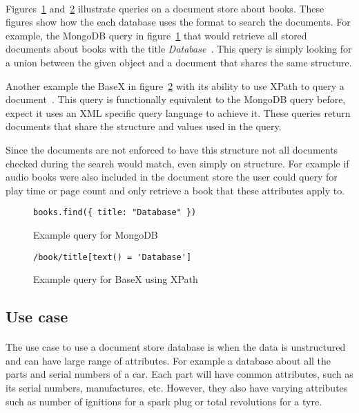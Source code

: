 \documentclass{CRPITStyle}
\renewcommand{\cite}{\citep}
\begin{document}
\paragraph{}
Figures~\ref{lst:mongo} and~\ref{lst:basex} illustrate queries on a document
store about books.
These figures show how the each database uses the format to search
the documents.
For example, the MongoDB query in figure~\ref{lst:mongo} that would retrieve all
stored documents about books with the title
\textit{Database}~\cite{nosql_db}.
This query is simply looking for a union between the given object and a
document that shares the same structure.

Another example the BaseX in figure~\ref{lst:basex} with its
ability to use XPath to query a document~\cite{basex}.
This query is functionally equivalent to the MongoDB query before, expect it uses
an XML specific query language to achieve it.
These queries return documents that share the structure and values used in the
query.

Since the documents are not enforced to have this structure not all documents
checked during the search would match, even simply on structure.
For example if audio books were also included in the document store the user
could query for play time or page count and only retrieve a book that these
attributes apply to.

\begin{figure}
\begin{verbatim}
books.find({ title: "Database" })
\end{verbatim}
\caption{Example query for MongoDB}
\label{lst:mongo}
\end{figure}

\begin{figure}
\begin{verbatim}
/book/title[text() = 'Database']
\end{verbatim}
\caption{Example query for BaseX using XPath}
\label{lst:basex}
\end{figure}

\subsection{Use case}

\paragraph{}
The use case to use a document store database is when
the data is unstructured and can have large range of attributes.
For example a database about all the parts and serial numbers
of a car.
Each part will have common attributes, such as its serial numbers,
manufactures, etc. 
However, they also have varying attributes such
as number of ignitions for a spark plug or total revolutions for
a tyre.
\end{document}

